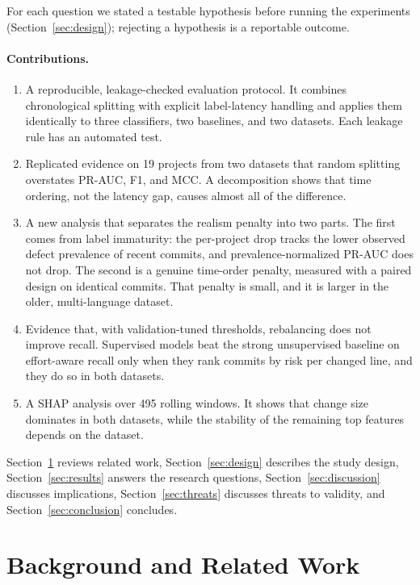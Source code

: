 \documentclass[11pt,a4paper]{article}
\begin{document}
For each question we stated a testable hypothesis before running the experiments (Section~\ref{sec:design}); rejecting a hypothesis is a reportable outcome.

\paragraph{Contributions.}
\begin{enumerate}
\item A reproducible, leakage-checked evaluation protocol. It combines chronological splitting with explicit label-latency handling and applies them identically to three classifiers, two baselines, and two datasets. Each leakage rule has an automated test.
\item Replicated evidence on 19 projects from two datasets that random splitting overstates PR-AUC, F1, and MCC. A decomposition shows that time ordering, not the latency gap, causes almost all of the difference.
\item A new analysis that separates the realism penalty into two parts. The first comes from label immaturity: the per-project drop tracks the lower observed defect prevalence of recent commits, and prevalence-normalized PR-AUC does not drop. The second is a genuine time-order penalty, measured with a paired design on identical commits. That penalty is small, and it is larger in the older, multi-language dataset.
\item Evidence that, with validation-tuned thresholds, rebalancing does not improve recall. Supervised models beat the strong unsupervised baseline on effort-aware recall only when they rank commits by risk per changed line, and they do so in both datasets.
\item A SHAP analysis over 495 rolling windows. It shows that change size dominates in both datasets, while the stability of the remaining top features depends on the dataset.
\end{enumerate}

Section~\ref{sec:related} reviews related work, Section~\ref{sec:design} describes the study design, Section~\ref{sec:results} answers the research questions, Section~\ref{sec:discussion} discusses implications, Section~\ref{sec:threats} discusses threats to validity, and Section~\ref{sec:conclusion} concludes.

\section{Background and Related Work}\label{sec:related}
\end{document}
